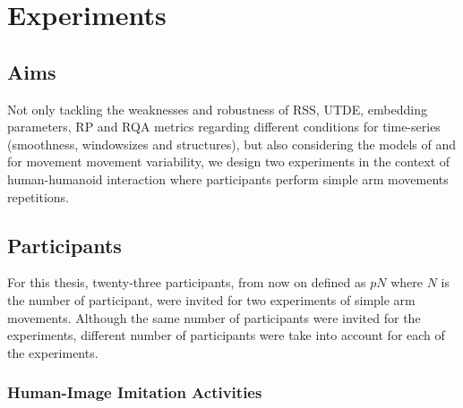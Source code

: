 			\chapter{Experiments}

%

\graphicspath{{figs/chapter4/PDF/}}




\section{Aims}
Not only tackling the weaknesses and robustness of RSS, UTDE, embedding 
parameters, RP and RQA metrics regarding different conditions for 
time-series (smoothness, windowsizes and structures), but also 
considering the models of \cite{stergiou2006} and 
\citep{vaillancourt2002, vaillancourt2003} for movement movement variability, 
we design two experiments in the context of human-humanoid interaction
where participants perform simple arm movements repetitions.


\section{Participants}
For this thesis, twenty-three participants, from now on defined as $pN$ 
where $N$ is the number of participant, were invited for two experiments of 
simple arm movements. Although the same number of participants were invited
for the experiments, different number of participants were take into account 
for each of the experiments.


\subsection{Human-Image Imitation Activities}





